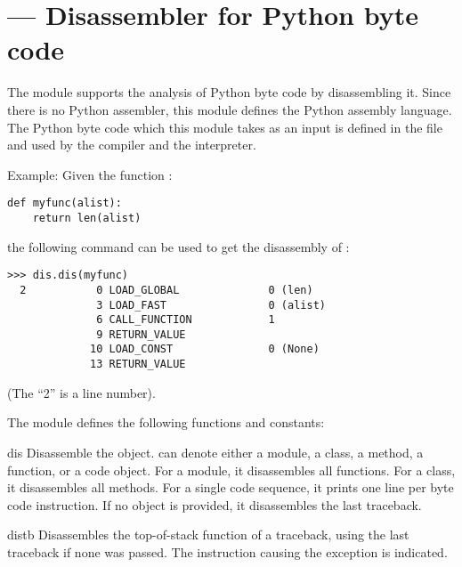 \section{ ---
         Disassembler for Python byte code}



The  module supports the analysis of Python byte code by
disassembling it.  Since there is no Python assembler, this module
defines the Python assembly language.  The Python byte code which
this module takes as an input is defined in the file 
 and used by the compiler and the interpreter.

Example: Given the function :

\begin{verbatim}
def myfunc(alist):
    return len(alist)
\end{verbatim}

the following command can be used to get the disassembly of
:

\begin{verbatim}
>>> dis.dis(myfunc)
  2           0 LOAD_GLOBAL              0 (len)
              3 LOAD_FAST                0 (alist)
              6 CALL_FUNCTION            1
              9 RETURN_VALUE        
             10 LOAD_CONST               0 (None)
             13 RETURN_VALUE
\end{verbatim}

(The ``2'' is a line number).

The  module defines the following functions and constants:

\begin{funcdesc}{dis}{}
Disassemble the  object.  can denote
either a module, a class, a method, a function, or a code object.  
For a module, it disassembles all functions.  For a class,
it disassembles all methods.  For a single code sequence, it prints
one line per byte code instruction.  If no object is provided, it
disassembles the last traceback.
\end{funcdesc}

\begin{funcdesc}{distb}{}
Disassembles the top-of-stack function of a traceback, using the last
traceback if none was passed.  The instruction causing the exception
is indicated.
\end{funcdesc}

